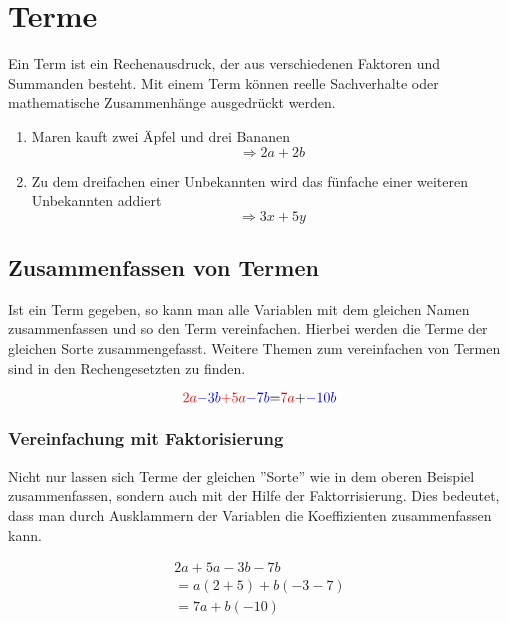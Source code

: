 \section{Terme}\label{sec:Terme}
Ein Term ist ein Rechenausdruck, der aus verschiedenen Faktoren und Summanden besteht. Mit einem Term können reelle Sachverhalte oder mathematische Zusammenhänge ausgedrückt werden.

\begin{beispiel}
\begin{enumerate}
	\item Maren kauft zwei Äpfel und drei Bananen
\[\Rightarrow2a+2b\]
\item Zu dem dreifachen einer Unbekannten wird das fünfache einer weiteren Unbekannten addiert
\[\Rightarrow 3x+5y\]
\end{enumerate}
\end{beispiel}

\subsection{Zusammenfassen von Termen}\label{sec:Zusammenfassen von Termen}
Ist ein Term gegeben, so kann man alle Variablen mit dem gleichen Namen zusammenfassen und so den Term vereinfachen. Hierbei werden die Terme der gleichen Sorte zusammengefasst. Weitere Themen zum vereinfachen von Termen sind in den Rechengesetzten zu finden.

\begin{beispiel}
	\[\color{red}{2a}\color{blue}{-3b} \color{red}{+5a}\color{blue}{-7b}\color{black}{=}\color{red}{7a}\color{black}{+}\color{blue}{-10b} \]
\end{beispiel}
\subsubsection{Vereinfachung mit Faktorisierung}
Nicht nur lassen sich Terme der gleichen ''Sorte'' wie in dem oberen Beispiel zusammenfassen, sondern auch mit der Hilfe der Faktorrisierung. Dies bedeutet, dass man durch Ausklammern der Variablen die Koeffizienten zusammenfassen kann. 

\begin{beispiel}
\begin{align*}
	2a+5a-3b-7b\\
	=a(2+5)+b(-3-7)\\
	=7a+b(-10)
\end{align*}	
\end{beispiel}

